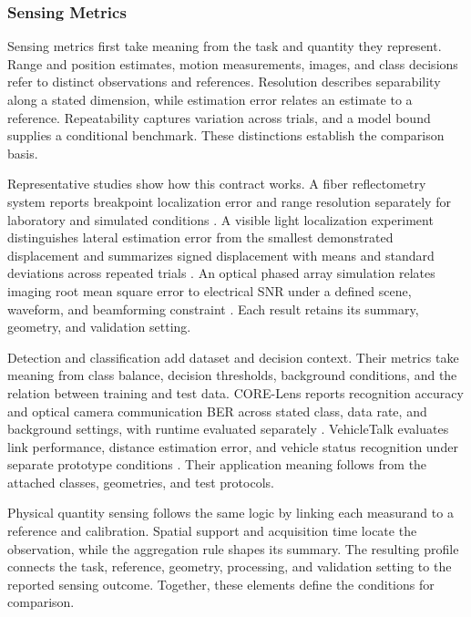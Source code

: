 \subsubsection{Sensing Metrics}

Sensing metrics first take meaning from the task and quantity they represent.
Range and position estimates, motion measurements, images, and class decisions
refer to distinct observations and references. Resolution describes
separability along a stated dimension, while estimation error relates an
estimate to a reference. Repeatability captures variation across trials, and a
model bound supplies a conditional benchmark. These distinctions establish the
comparison basis.

Representative studies show how this contract works. A fiber reflectometry
system reports breakpoint localization error and range resolution separately
for laboratory and simulated conditions \cite{OISAC_SCR00056}. A visible light
localization experiment distinguishes lateral estimation error from the
smallest demonstrated displacement and summarizes signed displacement with
means and standard deviations across repeated trials
\cite{OISAC_SCR00196}. An optical phased array simulation relates imaging root
mean square error to electrical SNR under a defined scene, waveform, and
beamforming constraint \cite{OISAC_SCR00940}. Each result retains its summary,
geometry, and validation setting.

Detection and classification add dataset and decision context. Their metrics
take meaning from class balance, decision thresholds, background conditions,
and the relation between training and test data. CORE-Lens reports recognition
accuracy and optical camera communication BER across stated class, data rate,
and background settings, with runtime evaluated separately
\cite{OISAC_SCR00833}. VehicleTalk evaluates link performance, distance
estimation error, and vehicle status recognition under separate prototype
conditions \cite{OISAC_SCR01034}. Their application meaning follows from the
attached classes, geometries, and test protocols.

Physical quantity sensing follows the same logic by linking each measurand to a
reference and calibration. Spatial support and acquisition time locate the
observation, while the aggregation rule shapes its summary. The resulting
profile connects the task, reference, geometry, processing, and validation
setting to the reported sensing outcome. Together, these elements define the
conditions for comparison.

